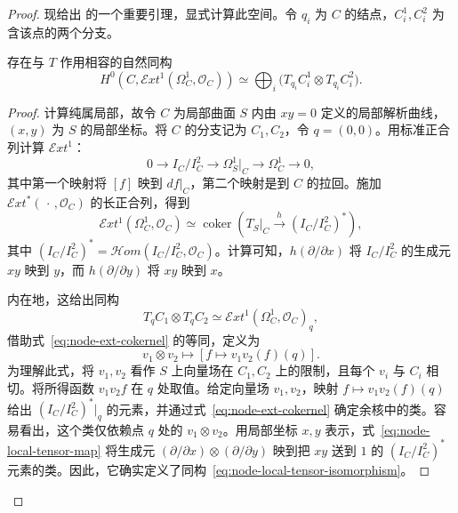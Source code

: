 \begin{proof}
现给出  的一个重要引理，显式计算此空间。令 $q_i$ 为 $C$ 的结点，$C_i^1,C_i^2$ 为含该点的两个分支。
\begin{lemma}\label{lem:node-smoothing-tangent-tensor}
存在与 $T$ 作用相容的自然同构
\[
H^0(C,\mathcal E xt^1(\Omega_C^1,\mathcal O_C))
\simeq\bigoplus_i\bigl(T_{q_i}C_i^1\otimes T_{q_i}C_i^2\bigr).
\]
\end{lemma}
\begin{proof}
计算纯属局部，故令 $C$ 为局部曲面 $S$ 内由 $xy=0$ 定义的局部解析曲线，$(x,y)$ 为 $S$ 的局部坐标。将 $C$ 的分支记为 $C_1,C_2$，令 $q=(0,0)$。用标准正合列计算 $\mathcal E xt^1$：
\begin{equation}\label{eq:node-conormal-sequence}
0\longrightarrow I_C/I_C^2\longrightarrow\Omega_S^1|_C\longrightarrow\Omega_C^1\longrightarrow0,
\end{equation}
其中第一个映射将 $[f]$ 映到 $df|_C$，第二个映射是到 $C$ 的拉回。施加 $\mathcal E xt^*(\,\cdot\,,\mathcal O_C)$ 的长正合列，得到
\begin{equation}\label{eq:node-ext-cokernel}
\mathcal E xt^1(\Omega_C^1,\mathcal O_C)
\simeq\operatorname{coker}\left(T_S|_C\xrightarrow h(I_C/I_C^2)^*\right),
\end{equation}
其中 $(I_C/I_C^2)^*=\mathcal H om(I_C/I_C^2,\mathcal O_C)$。计算可知，$h(\partial/\partial x)$ 将 $I_C/I_C^2$ 的生成元 $xy$ 映到 $y$，而 $h(\partial/\partial y)$ 将 $xy$ 映到 $x$。

内在地，这给出同构
\begin{equation}\label{eq:node-local-tensor-isomorphism}
T_qC_1\otimes T_qC_2\simeq\mathcal E xt^1(\Omega_C^1,\mathcal O_C)_q,
\end{equation}
借助式~\eqref{eq:node-ext-cokernel} 的等同，定义为
\begin{equation}\label{eq:node-local-tensor-map}
v_1\otimes v_2\longmapsto[f\longmapsto v_1v_2(f)(q)].
\end{equation}
为理解此式，将 $v_1,v_2$ 看作 $S$ 上向量场在 $C_1,C_2$ 上的限制，且每个 $v_i$ 与 $C_i$ 相切。将所得函数 $v_1v_2f$ 在 $q$ 处取值。给定向量场 $v_1,v_2$，映射 $f\mapsto v_1v_2(f)(q)$ 给出 $(I_C/I_C^2)^*|_q$ 的元素，并通过式~\eqref{eq:node-ext-cokernel} 确定余核中的类。容易看出，这个类仅依赖点 $q$ 处的 $v_1\otimes v_2$。用局部坐标 $x,y$ 表示，式~\eqref{eq:node-local-tensor-map} 将生成元 $(\partial/\partial x)\otimes(\partial/\partial y)$ 映到把 $xy$ 送到 $1$ 的 $(I_C/I_C^2)^*$ 元素的类。因此，它确实定义了同构~\eqref{eq:node-local-tensor-isomorphism}。


\end{proof}
\end{proof}
